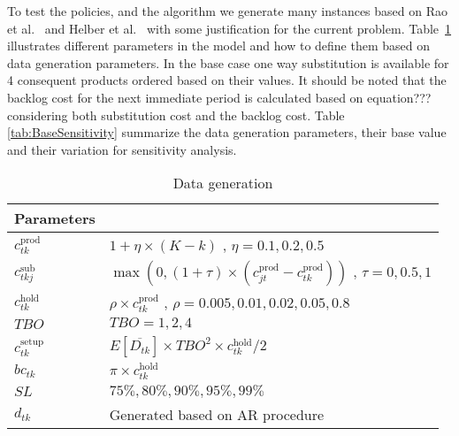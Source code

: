 \documentclass[10pt]{article}
\newcommand{\ti}{t} %
\newcommand{\ka}{k} %
\newcommand{\Ka}{K}
\newcommand{\jey}{j} %
\begin{document}
To test the policies, and the algorithm we generate many instances based on Rao et al.~\cite{rao2004multi} and Helber et al.~\cite{helber2013dynamic} with some justification for the current problem. Table~\ref{tab:Sub_FD_parameters} illustrates different parameters in the model and how to define them based on data generation parameters. In the base case one way substitution is available for 4 consequent products ordered based on their values. It should be noted that the backlog cost for the next immediate period is calculated based on equation??? considering both substitution cost and the backlog cost. Table \ref{tab:BaseSensitivity} summarize the data generation parameters, their base value and their variation for sensitivity analysis. 




\begin{table}[H]
\centering
\caption{Data generation }
\begin{tabular}{ll}
\toprule
{\bf Parameters} &  \\ \midrule
$c^{\text{prod}}_{\ti \ka}$  & $1+\eta \times(\Ka-\ka)$   , $\eta = 0.1, 0.2 , 0.5$ \\
$c^{\text{sub}}_{\ti \ka \jey }$  & $\max(0,(1+\tau) \times (c^{\text{prod}}_{\jey \ti} - c^{\text{prod}}_{\ti \ka}))$ , $\tau = 0 , 0.5 , 1$  \\ 
$c^{\text{hold}}_{\ti \ka}$  & $\rho \times c^{\text{prod}}_{\ti \ka} $ , $\rho = 0.005, 0.01, 0.02, 0.05 ,0.8$   \\ 
$TBO$  &  $TBO = 1, 2, 4$   \\ 
$c^{\text{setup}}_{\ti \ka}$ & $E[\overline{D_{\ti \ka}}] \times TBO^2 \times c^{\text{hold}}_{\ti \ka} /2$ \\ 
$bc_{\ti \ka}$  &  $\pi \times c^{\text{hold}}_{\ti \ka}$ \\
$SL$  &  $ 75\%, 80\%, 90\%, 95\%, 99\%$ \\
${d}_{\ti \ka}$  & Generated based on AR procedure
 \\ \bottomrule
\end{tabular}
 \label{tab:Sub_FD_parameters}
\end{table}
\end{document}
